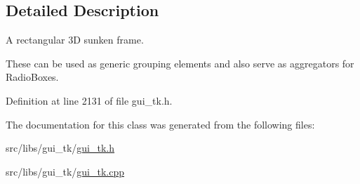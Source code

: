 \subsection{Detailed Description}
A rectangular 3\-D sunken frame. 

These can be used as generic grouping elements and also serve as aggregators for Radio\-Boxes. 

Definition at line 2131 of file gui\-\_\-tk.\-h.



The documentation for this class was generated from the following files\-:\begin{DoxyCompactItemize}
\item 
src/libs/gui\-\_\-tk/\hyperlink{gui__tk_8h}{gui\-\_\-tk.\-h}\item 
src/libs/gui\-\_\-tk/\hyperlink{gui__tk_8cpp}{gui\-\_\-tk.\-cpp}\end{DoxyCompactItemize}
